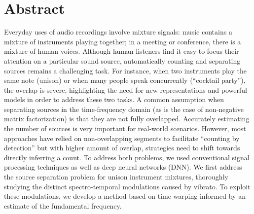 \begingroup
\let\clearpage\relax
\let\cleardoublepage\relax
\let\cleardoublepage\relax

\chapter*{Abstract}
Everyday uses of audio recordings involve mixture signals: music contains a mixture of instruments playing together; in a meeting or conference, there is a mixture of human voices.
Although human listeners find it easy to focus their attention on a particular sound source, automatically counting and separating sources remains a challenging task.
For instance, when two instruments play the same note (unison) or when many people speak concurrently (``cocktail party''), the overlap is severe, highlighting the need for new representations and powerful models in order to address these two tasks.
A common assumption when separating sources in the time-frequency domain (as is the case of non-negative matrix factorization) is that they are not fully overlapped.
Accurately estimating the number of sources is very important for real-world scenarios.
However, most approaches have relied on non-overlapping segments to facilitate ``counting by detection'' but with higher amount of overlap, strategies need to shift towards directly inferring a count.
To address both problems, we used conventional signal processing techniques as well as deep neural networks (DNN).
We first address the source separation problem for unison instrument mixtures, 
thoroughly studying the distinct spectro-temporal modulations caused by vibrato. 
To exploit these modulations, we develop a method based on time warping informed by an estimate of the fundamental frequency. 
